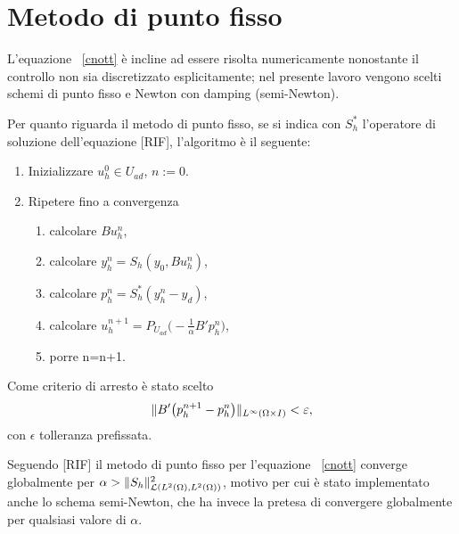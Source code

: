 \section{Metodo di punto fisso}

L'equazione ~\eqref{cnott} è incline ad essere risolta numericamente nonostante il controllo non sia discretizzato esplicitamente; nel presente lavoro vengono scelti schemi di punto fisso e Newton con damping (semi-Newton).

Per quanto riguarda il metodo di punto fisso, se si indica con $ S^*_h $ l'operatore di soluzione dell'equazione [RIF], l'algoritmo è il seguente:
\begin{algoritmo}

\begin{enumerate}
\item Inizializzare $ u^0_h\in U_{ad} $, $ n:=0 $.
\item Ripetere fino a convergenza
          \begin{enumerate}
          \item calcolare $ Bu^n_h $,
          \item calcolare $ y^n_h=S_h(y_0,Bu^n_h) $, 
          \item calcolare $ p^n_h=S^*_h(y^n_h-y_d) $,
          \item calcolare $ u^{n+1}_h=P_{U_{ad}}\big( -\frac{1}{\alpha}B'p^n_h\big) $,
          \item porre n=n+1.
          \end{enumerate}
\end{enumerate}

Come criterio di arresto è stato scelto   
\begin{equation}
\lVert B'\big(p^{n+1}_h-p^n_h\big)\rVert_{L^{\infty}(\Omega\times I)}<\varepsilon,
\label{eq:PuntoFissotoll}
\end{equation}
con $ \epsilon $ tolleranza prefissata.
\label{PuntoFisso}
\end{algoritmo}

Seguendo [RIF] il metodo di punto fisso per l'equazione ~\eqref{cnott} converge globalmente per $ \alpha>\lVert S_h\rVert^2_{\mathcal{L}(L^2(\Omega),L^2(\Omega))} $, motivo per cui è stato implementato anche lo schema semi-Newton, che ha invece la pretesa di convergere globalmente per qualsiasi valore di $ \alpha $.

